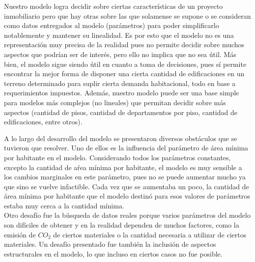 \documentclass[letterpaper]{article}
\begin{document}
Nuestro modelo logra decidir sobre ciertas características de un proyecto inmobiliario pero que hay otras sobre las que solamense se supone o se consideran como datos
entregados al modelo (parámetros) para poder simplificarlo notablemente y mantener su linealidad. Es por esto que el modelo no es una representación muy precisa
de la realidad pues no permite decidir sobre muchos aspectos que podrían ser de interés, pero ello no implica que no sea útil. Más bien, el modelo sigue siendo útil
en cuanto a toma de decisiones, pues sí permite encontrar la mejor forma de disponer una cierta cantidad de edificaciones en un terreno determinado para suplir cierta
demanda habitacional, todo en base a requerimientos impuestos. Además, nuestro modelo puede ser una base simple para modelos más complejos (no lineales) que permitan
decidir sobre más aspectos (cantidad de pisos, cantidad de departamentos por piso, cantidad de edificaciones, entre otros). \newline \newline

A lo largo del desarrollo del modelo se presentaron diversos obstáculos que se tuvieron que resolver. Uno de ellos es la influencia del parámetro de área mínima por habitante
en el modelo. Considerando todos los parámetros constantes, excepto la cantidad de aŕea mínima por habitante, el modelo es muy sensible a los cambios marginales en este parámetro,
pues no se puede aumentar mucho ya que sino se vuelve infactible. Cada vez que se aumentaba un poco, la cantidad de área mínima por habitante que el modelo destinó para esos valores
de parámetros estaba muy cerca a la cantidad mínima.\\

Otro desafío fue la búsqueda de datos reales porque varios parámetros del modelo son difíciles de obtener y en la realidad dependen de muchos factores, como la emisión de $CO_2$ de 
ciertos materiales o la cantidad necesaria a utilizar de ciertos materiales. Un desafío presentado fue también la inclusión de aspectos estructurales en el modelo, lo que incluso en 
ciertos casos no fue posible.\\
\end{document}
